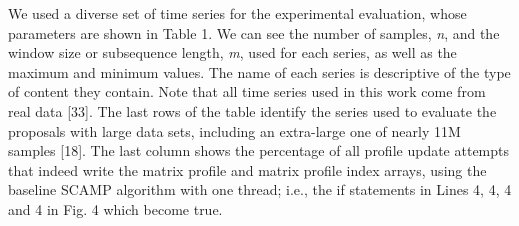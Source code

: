 We used a diverse set of time series for the experimental evaluation,
whose parameters are shown in Table 1. We can see the number of
samples, \textit{n}, and the window size or subsequence length, \textit{m}, used for
each series, as well as the maximum and minimum values. The name of
each series is descriptive of the type of content they contain. Note that
all time series used in this work come from real data [33]. The last rows
of the table identify the series used to evaluate the proposals with large
data sets, including an extra-large one of nearly 11M samples [18]. The
last column shows the percentage of all profile update attempts that
indeed write the matrix profile and matrix profile index arrays, using
the baseline SCAMP algorithm with one thread; i.e., the if statements in
Lines 4, 4, 4 and 4 in Fig. 4 which become true.
